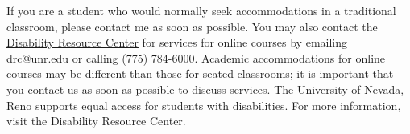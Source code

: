 If you are a student who would normally seek accommodations in a traditional
classroom, please contact me as soon as possible. You may also contact the
\href{https://www.unr.edu/drc}{Disability Resource Center} for services for online
courses by emailing drc@unr.edu or calling (775) 784-6000. Academic accommodations
for online courses may be different than those for seated classrooms; it is
important that you contact us as soon as possible to discuss services. The
University of Nevada, Reno supports equal access for students with disabilities.
For more information, visit the Disability Resource Center.

